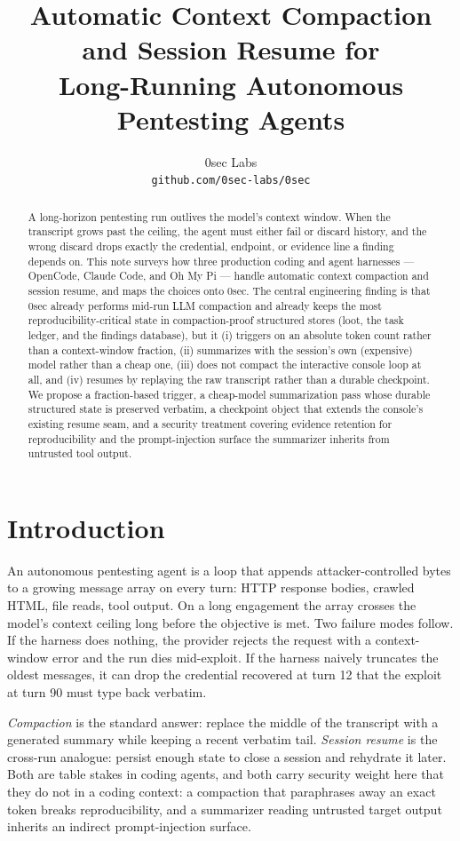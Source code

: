\documentclass[11pt]{article}
\title{Automatic Context Compaction and Session Resume for\\Long-Running Autonomous Pentesting Agents}
\author{
  0sec Labs \\
  \texttt{github.com/0sec-labs/0sec}
}
\date{}
\begin{document}
\maketitle

\begin{abstract}
A long-horizon pentesting run outlives the model's context window. When the
transcript grows past the ceiling, the agent must either fail or discard
history, and the wrong discard drops exactly the credential, endpoint, or
evidence line a finding depends on. This note surveys how three production
coding and agent harnesses --- OpenCode, Claude Code, and Oh My Pi --- handle
automatic context compaction and session resume, and maps the choices onto 0sec.
The central engineering finding is that 0sec already performs mid-run LLM
compaction and already keeps the most reproducibility-critical state in
compaction-proof structured stores (loot, the task ledger, and the findings
database), but it (i) triggers on an absolute token count rather than a
context-window fraction, (ii) summarizes with the session's own (expensive)
model rather than a cheap one, (iii) does not compact the interactive console
loop at all, and (iv) resumes by replaying the raw transcript rather than a
durable checkpoint. We propose a fraction-based trigger, a cheap-model
summarization pass whose durable structured state is preserved verbatim, a
checkpoint object that extends the console's existing resume seam, and a
security treatment covering evidence retention for reproducibility and the
prompt-injection surface the summarizer inherits from untrusted tool output.
\end{abstract}

\section{Introduction}

An autonomous pentesting agent is a loop that appends attacker-controlled bytes
to a growing message array on every turn: HTTP response bodies, crawled HTML,
file reads, tool output. On a long engagement the array crosses the model's
context ceiling long before the objective is met. Two failure modes follow. If
the harness does nothing, the provider rejects the request with a context-window
error and the run dies mid-exploit. If the harness naively truncates the oldest
messages, it can drop the credential recovered at turn 12 that the exploit at
turn 90 must type back verbatim.

\emph{Compaction} is the standard answer: replace the middle of the transcript
with a generated summary while keeping a recent verbatim tail. \emph{Session
resume} is the cross-run analogue: persist enough state to close a session and
rehydrate it later. Both are table stakes in coding agents, and both carry
security weight here that they do not in a coding context: a compaction that
paraphrases away an exact token breaks reproducibility, and a summarizer reading
untrusted target output inherits an indirect prompt-injection surface.
\end{document}
